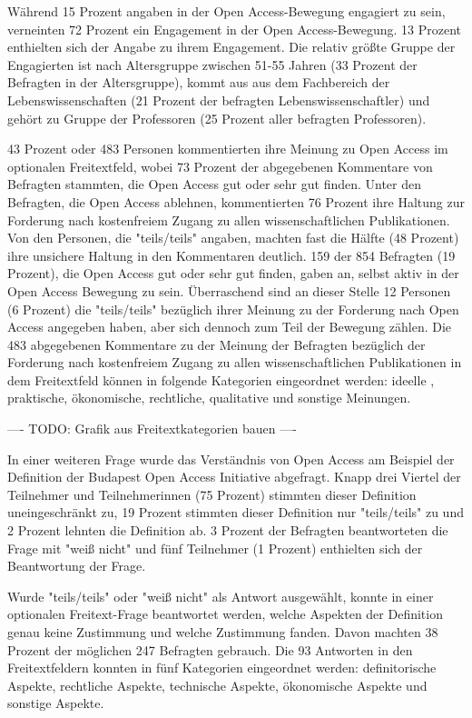 Während 15 Prozent angaben in der Open Access-Bewegung engagiert zu sein, verneinten 72 Prozent ein Engagement in der Open Access-Bewegung. 13 Prozent enthielten sich der Angabe zu ihrem Engagement. Die relativ größte Gruppe der Engagierten ist nach Altersgruppe zwischen 51-55 Jahren (33 Prozent der Befragten in der Altersgruppe), kommt aus aus dem Fachbereich der Lebenswissenschaften (21 Prozent der befragten Lebenswissenschaftler) und gehört zu Gruppe der Professoren (25 Prozent aller befragten Professoren).

43 Prozent oder 483 Personen kommentierten ihre Meinung zu Open Access im optionalen Freitextfeld, wobei 73 Prozent der abgegebenen Kommentare von Befragten stammten, die Open Access gut oder sehr gut finden. Unter den Befragten, die Open Access ablehnen, kommentierten 76 Prozent ihre Haltung zur Forderung nach kostenfreiem Zugang zu allen wissenschaftlichen Publikationen. Von den Personen, die "teils/teils" angaben, machten fast die Hälfte (48 Prozent) ihre unsichere Haltung in den Kommentaren deutlich. 159 der 854 Befragten (19 Prozent), die Open Access gut oder sehr gut finden, gaben an, selbst aktiv in der Open Access Bewegung zu sein. Überraschend sind an dieser Stelle 12 Personen (6 Prozent) die "teils/teils" bezüglich ihrer Meinung zu der Forderung nach Open Access angegeben haben, aber sich dennoch zum Teil der Bewegung zählen. Die 483 abgegebenen Kommentare zu der Meinung der Befragten bezüglich der Forderung nach kostenfreiem Zugang zu allen wissenschaftlichen Publikationen in dem Freitextfeld können in folgende Kategorien eingeordnet werden: ideelle , praktische, ökonomische, rechtliche, qualitative und sonstige Meinungen.

---- TODO: Grafik aus Freitextkategorien bauen ----

In einer weiteren Frage wurde das Verständnis von Open Access am Beispiel der Definition der Budapest Open Access Initiative \cite{boai_2012} abgefragt. Knapp drei Viertel der Teilnehmer und Teilnehmerinnen (75 Prozent) stimmten dieser Definition uneingeschränkt zu, 19 Prozent stimmten dieser Definition nur "teils/teils" zu und 2 Prozent lehnten die Definition ab. 3 Prozent der Befragten beantworteten die Frage mit "weiß nicht" und fünf Teilnehmer (1 Prozent) enthielten sich der Beantwortung der Frage.

Wurde "teils/teils" oder "weiß nicht" als Antwort ausgewählt, konnte in einer optionalen Freitext-Frage beantwortet werden, welche Aspekten der Definition genau keine Zustimmung und welche Zustimmung fanden. Davon machten 38 Prozent der möglichen 247 Befragten gebrauch. Die 93 Antworten in den Freitextfeldern konnten in fünf Kategorien eingeordnet werden: definitorische Aspekte, rechtliche Aspekte, technische Aspekte, ökonomische Aspekte und sonstige Aspekte.

